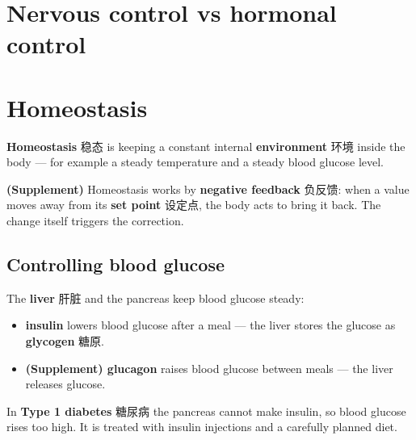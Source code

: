 \documentclass[11pt]{article}
\begin{document}
\section*{Nervous control vs hormonal control}

\begin{center}
\end{center}

\section*{Homeostasis}

\textbf{Homeostasis} 稳态 is keeping a constant internal \textbf{environment} 环境 inside the body — for example a steady temperature and a steady blood glucose level.

\textbf{(Supplement)} Homeostasis works by \textbf{negative feedback} 负反馈: when a value moves away from its \textbf{set point} 设定点, the body acts to bring it back. The change itself triggers the correction.

\subsection*{Controlling blood glucose}

The \textbf{liver} 肝脏 and the pancreas keep blood glucose steady:

\begin{itemize}
\item \textbf{insulin} lowers blood glucose after a meal — the liver stores the glucose as \textbf{glycogen} 糖原.

\item \textbf{(Supplement) glucagon} raises blood glucose between meals — the liver releases glucose.

\end{itemize}

In \textbf{Type 1 diabetes} 糖尿病 the pancreas cannot make insulin, so blood glucose rises too high. It is treated with insulin injections and a carefully planned diet.
\end{document}
